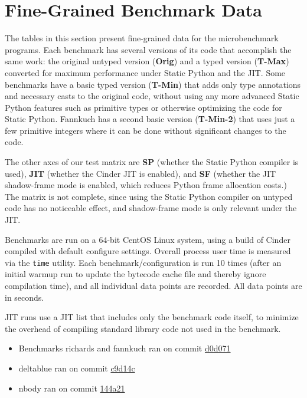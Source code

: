 \documentclass[english,cleveref,crc]{programming}
\newcommand{\code}[1]{\texttt{#1}}
\newcommand{\bmname}[1]{\textsf{#1}}
\begin{document}
\section{Fine-Grained Benchmark Data}
\label{a:microbench-detail}

\newcommand{\colname}[1]{\textbf{#1}}

The tables in this section present fine-grained data for the microbenchmark programs.
Each benchmark has several versions of its code that accomplish the same work:
the original untyped version (\colname{Orig}) and a typed version (\colname{T-Max}) converted for maximum
performance under Static Python and the JIT.
Some benchmarks have a basic typed version (\colname{T-Min}) that adds only
type annotations and necessary casts to the original code,
without using any more advanced Static Python
features such as primitive types or otherwise optimizing the code for Static
Python.
Fannkuch has a second basic version (\colname{T-Min-2}) that uses just a few primitive integers
where it can be done without significant changes to the code.

The other axes of our test matrix are \colname{SP} (whether the Static Python compiler is
used), \colname{JIT} (whether the Cinder JIT is enabled), and \colname{SF} (whether the JIT
shadow-frame mode is enabled, which reduces Python frame allocation costs.) The
matrix is not complete, since using the Static Python compiler on untyped code
has no noticeable effect, and shadow-frame mode is only relevant under the JIT.

Benchmarks are run on a 64-bit CentOS Linux system, using a build of Cinder
compiled with default configure settings. Overall process user time is measured
via the \code{time} utility. Each benchmark/configuration is run 10 times (after an
initial warmup run to update the bytecode cache file and thereby ignore compilation time),
and all individual data points are
recorded. All data points are in seconds.

JIT runs use a JIT list that includes only the benchmark code itself, to
minimize the overhead of compiling standard library code not used in the
benchmark.

\begin{itemize}
  \item
    Benchmarks \bmname{richards} and \bmname{fannkuch} ran on commit
    \href{https://github.com/facebookincubator/cinder/commit/d0d071a9acf3e65700e7c6f8982c5087c700d116}{d0d071}
  \item
    \bmname{deltablue} ran on commit
    \href{https://github.com/facebookincubator/cinder/commit/c9d14c4474facfeca15b618015b58b99a3e86d25}{c9d14c}
  \item
    \bmname{nbody} ran on commit
    \href{https://github.com/facebookincubator/cinder/commit/144a21e66aeae5cde08847482249396b2e16eccc}{144a21}
\end{itemize}
\end{document}
